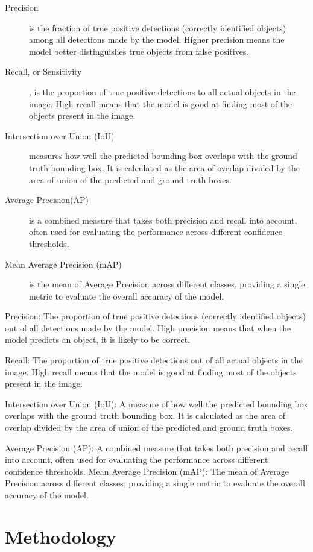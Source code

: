 \begin{description}
\item[Precision] is the fraction of true positive detections (correctly identified objects) among all detections made by the model. Higher precision means the model better distinguishes true objects from false positives.

\item[Recall, or Sensitivity], is the proportion of true positive detections to all actual objects in the image. High recall means that the model is good at finding most of the objects present in the image.

\item[Intersection over Union (IoU)] measures how well the predicted bounding box overlaps with the ground truth bounding box. It is calculated as the area of overlap divided by the area of union of the predicted and ground truth boxes.

\item[Average Precision(AP)] is a combined measure that takes both precision and recall into account, often used for evaluating the performance across different confidence thresholds.

\item[Mean Average Precision (mAP)] is the mean of Average Precision across different classes, providing a single metric to evaluate the overall accuracy of the model.


\end{description}

Precision: The proportion of true positive detections (correctly identified objects) out of all detections made by the model. High precision means that when the model predicts an object, it is likely to be correct.

Recall: The proportion of true positive detections out of all actual objects in the image. High recall means that the model is good at finding most of the objects present in the image.

Intersection over Union (IoU): A measure of how well the predicted bounding box overlaps with the ground truth bounding box. It is calculated as the area of overlap divided by the area of union of the predicted and ground truth boxes.

Average Precision (AP): A combined measure that takes both precision and recall into account, often used for evaluating the performance across different confidence thresholds.
Mean Average Precision (mAP): The mean of Average Precision across different classes, providing a single metric to evaluate the overall accuracy of the model.

\section{Methodology}

